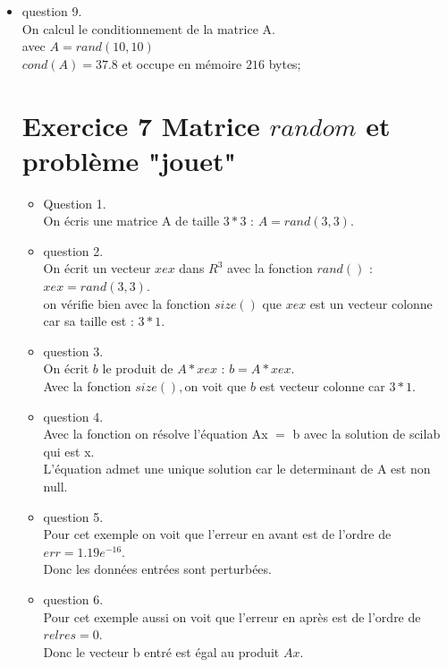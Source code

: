 \documentclass[]{article}
\begin{document}
\begin{itemize}
\item {question 9. \\}
On calcul le conditionnement de la matrice A.\\
avec $A=rand(10,10)$\\
$cond(A) =37.8 $ et occupe en mémoire $216$ bytes;\\

\section{Exercice 7  Matrice $ random$ et problème "jouet"}

\begin{itemize}
\item {Question 1. \\}
On écris une matrice A de taille $3*3$ : $ A = rand(3,3)$.\\

\item {question 2. \\}
On écrit un vecteur $xex$ dans $R^{3}$ avec la fonction $rand()$ : $ xex = rand(3,3)$.\\
on vérifie bien avec la fonction $size()$ que  $ xex $ est un vecteur colonne car sa taille est : $ 3*1$.\\

\item {question 3. \\}
On écrit $b$ le produit de $ A*xex $ : $ b = A*xex$.\\
Avec la fonction $ size(), $on voit que $b$ est vecteur colonne car $3*1$.\\ 

\item {question 4. \\}
Avec la fonction on résolve l'équation Ax $=$ b avec la solution de scilab qui est x.\\
L'équation admet une unique solution car le determinant de A est non null.\\

\item {question 5. \\}
Pour cet exemple on voit que l'erreur en avant est de l'ordre de $err=1.19e^{-16}$.\\
Donc les données entrées sont perturbées.\\

\item {question 6. \\}
Pour cet exemple aussi on voit que l'erreur en après est de l'ordre de $relres=0$.\\
Donc le vecteur b entré est égal au produit $Ax$.\\


\end{itemize}
\end{itemize}
\end{document}
